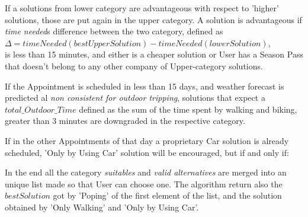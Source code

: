 	If a solutions from lower category are advantageous with respect to 'higher' solutions, those are put again in the upper category.
	A solution is advantageous if \textit{time needed}s difference between the two category, defined as 
	\\ \quad $\Delta =  timeNeeded(bestUpperSolution) - timeNeeded(lowerSolution)$, \\
	is less than 15 minutes, and either is a cheaper solution or User has a Season Pass that doesn't belong to any other company of Upper-category solutions.
		
	If the Appointment is scheduled in less than 15 days, and weather forecast is predicted al \textit{non consistent for outdoor tripping}, solutions that expect a $total\_Outdoor\_Time$ defined as the sum of the time spent by walking and biking, greater than 3 minutes are downgraded in the respective category.

	If in the other Appointments of that day a proprietary Car solution is already scheduled, 'Only by Using Car' solution will be encouraged, but if and only if:

	In the end all the category \textit{suitables} and \textit{valid alternatives} are merged into an unique list made so that User can choose one.
	The algorithm return also the $bestSolution$ got by 'Poping' of the first element of the list, and the solution obtained by 'Only Walking' and 'Only by Using Car'.
		
\bigskip
	